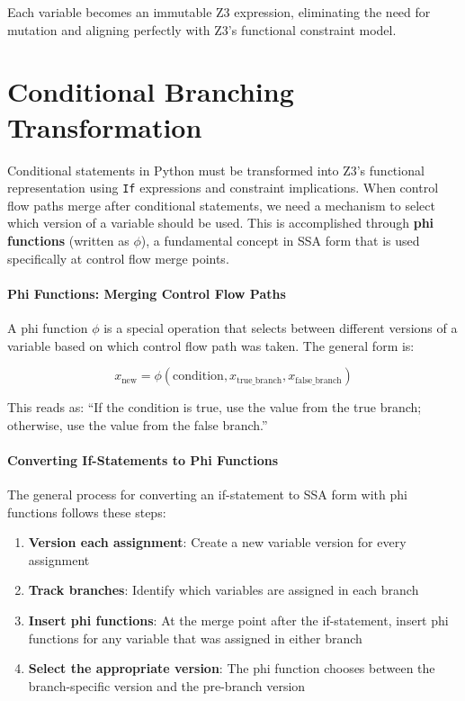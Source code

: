 Each variable becomes an immutable Z3 expression, eliminating the need for mutation and aligning perfectly with Z3's functional constraint model.

\section{Conditional Branching Transformation}

Conditional statements in Python must be transformed into Z3's functional representation using \texttt{If} expressions and constraint implications. When control flow paths merge after conditional statements, we need a mechanism to select which version of a variable should be used. This is accomplished through \textbf{phi functions} (written as $\phi$), a fundamental concept in SSA form that is used specifically at control flow merge points.

\paragraph{Phi Functions: Merging Control Flow Paths}

A phi function $\phi$ is a special operation that selects between different versions of a variable based on which control flow path was taken. The general form is:

\[
x_{\text{new}} = \phi(\text{condition}, x_{\text{true\_branch}}, x_{\text{false\_branch}})
\]

This reads as: ``If the condition is true, use the value from the true branch; otherwise, use the value from the false branch.''

\paragraph{Converting If-Statements to Phi Functions}

The general process for converting an if-statement to SSA form with phi functions follows these steps:

\begin{enumerate}
    \item \textbf{Version each assignment}: Create a new variable version for every assignment
    \item \textbf{Track branches}: Identify which variables are assigned in each branch
    \item \textbf{Insert phi functions}: At the merge point after the if-statement, insert phi functions for any variable that was assigned in either branch
    \item \textbf{Select the appropriate version}: The phi function chooses between the branch-specific version and the pre-branch version
\end{enumerate}

